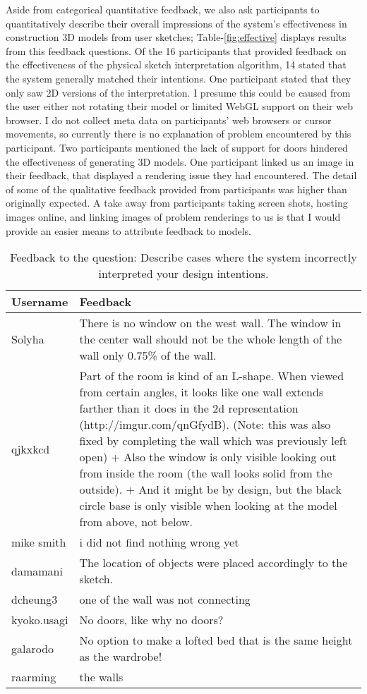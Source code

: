 Aside from categorical quantitative feedback, we also ask participants to quantitatively describe their overall impressions of the system's effectiveness in construction 3D models from user sketches; 
Table-\ref{fig:effective} displays results from this feedback questions.
Of the 16 participants that provided feedback on the effectiveness of the physical sketch interpretation algorithm, 14 stated that the system generally matched their intentions.
One participant stated that they only saw 2D versions of the interpretation.
I presume this could be caused from the user either not rotating their model or limited WebGL support on their web browser.
I do  not collect meta data on participants' web browsers or cursor movements, so currently there is no explanation of problem encountered by this participant.
Two participants mentioned the lack of support for doors hindered the effectiveness of generating 3D models.
One participant linked us an image in their feedback, that displayed a rendering issue they had encountered.
The detail of some of the qualitative feedback provided from participants was higher than originally expected.
A take away from participants taking screen shots, hosting images online, and linking images of problem renderings to us is that I would provide an easier means to attribute feedback to models.\\


\begin{table}[h]
\centering
\begin{tabular}{|p{}|p{}|}
\hline
\rowcolor[HTML]{EFEFEF} 
\textbf{Username} & \textbf{Feedback} \\ \hline
Solyha & There is no window on the west wall. The window in the center wall should not be the whole length of the wall only 0.75\% of the wall. \\ \hline
qjkxkcd & Part of the room is kind of an L-shape. When viewed from certain angles, it looks like one wall extends farther than it does in the 2d representation (http://imgur.com/qnGfydB). (Note: this was also fixed by completing the wall which was previously left open) + Also the window is only visible looking out from inside the room (the wall looks solid from the outside). +  And it might be by design, but the black circle base is only visible when looking at the model from above, not below. \\ \hline
mike smith & i did not find nothing wrong yet \\ \hline
damamani & The location of objects were placed accordingly to the sketch. \\ \hline
dcheung3 & one of the wall was not connecting \\ \hline
kyoko.usagi & No doors, like why no doors? \\ \hline
galarodo & No option to make a lofted bed that is the same height as the wardrobe! \\ \hline
raarming & the walls \\ \hline
\end{tabular}
\caption{Feedback to the question: Describe cases where the system incorrectly interpreted your design intentions.}
\label{fig:failure}
\end{table}

